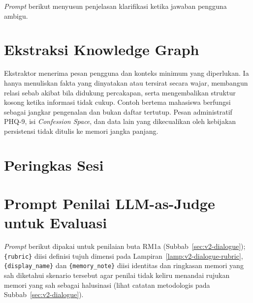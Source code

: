 \textit{Prompt} berikut menyusun penjelasan klarifikasi ketika jawaban pengguna ambigu.


\section{Ekstraksi Knowledge Graph}
\label{lamp:agentic-prompts-kg}

Ekstraktor menerima pesan pengguna dan konteks minimum yang diperlukan. Ia hanya menuliskan fakta yang dinyatakan atau tersirat secara wajar, membangun relasi sebab akibat bila didukung percakapan, serta mengembalikan struktur kosong ketika informasi tidak cukup. Contoh bertema mahasiswa berfungsi sebagai jangkar pengenalan dan bukan daftar tertutup. Pesan administratif PHQ-9, isi \textit{Confession Space}, dan data lain yang dikecualikan oleh kebijakan persistensi tidak ditulis ke memori jangka panjang.


\section{Peringkas Sesi}
\label{lamp:prompt-session-summarizer}


\section{Prompt Penilai LLM-as-Judge untuk Evaluasi}
\label{lamp:prompt-judge}

\textit{Prompt} berikut dipakai untuk penilaian buta RM1a (Subbab~\ref{sec:v2-dialogue}); \texttt{\{rubric\}} diisi definisi tujuh dimensi pada Lampiran~\ref{lamp:v2-dialogue-rubric}, \texttt{\{display\_name\}} dan \texttt{\{memory\_note\}} diisi identitas dan ringkasan memori yang sah diketahui skenario tersebut agar penilai tidak keliru menandai rujukan memori yang sah sebagai halusinasi (lihat catatan metodologis pada Subbab~\ref{sec:v2-dialogue}).


